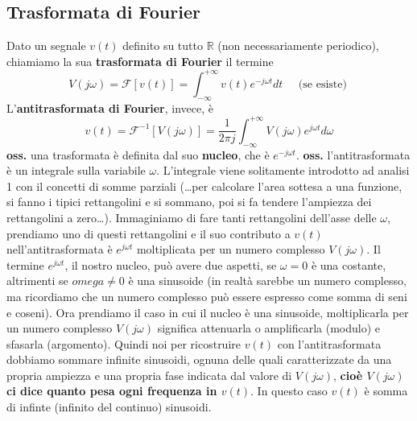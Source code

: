 \subsection{Trasformata di Fourier}
Dato un segnale $v(t)$ definito su tutto $\mathbb{R}$ (non necessariamente periodico), chiamiamo la sua \textbf{trasformata di Fourier} il termine 
\[
    V(j \omega) = \mathcal{F}[v(t)] = \int_{-\infty}^{+\infty} v(t) e^{-j \omega t} dt \;\;\;\;\;\text{(se esiste)}\;
\]
L'\textbf{antitrasformata di Fourier}, invece, è
\[
    v(t) = \mathcal{F}^{-1}[V(j \omega)] = \frac{1}{2\pi j} \int_{-\infty}^{+\infty} V(j \omega) e^{j \omega t} d \omega
\]
\textbf{oss.} una trasformata è definita dal suo \textbf{nucleo}, che è $e^{-j \omega t}$.\newline
\newline
\textbf{oss.} l'antitrasformata è un integrale sulla variabile $\omega$. L'integrale viene solitamente introdotto ad analisi 1 con il concetti di somme parziali (\dots per calcolare l'area sottesa a una funzione, si fanno i tipici rettangolini e si sommano, poi si fa tendere l'ampiezza dei rettangolini a zero\dots). Immaginiamo di fare tanti rettangolini dell'asse delle $\omega$, prendiamo uno di questi rettangolini e il suo contributo a $v(t)$ nell'antitrasformata è $e^{j \omega t}$ moltiplicata per un numero complesso $V(j \omega )$. Il termine $e^{j \omega t}$, il nostro nucleo, può avere due aspetti, se $\omega= 0$ è una costante, altrimenti se $omega \neq 0$ è una sinusoide (in realtà sarebbe un numero complesso, ma ricordiamo che un numero complesso può essere espresso come somma di seni e coseni). Ora prendiamo il caso in cui il nucleo è una sinusoide, moltiplicarla per un numero complesso $V(j \omega)$ significa attenuarla o amplificarla (modulo) e sfasarla (argomento). Quindi noi per ricostruire $v(t)$ con l'antitrasformata dobbiamo sommare infinite sinusoidi, ognuna delle quali caratterizzate da una propria ampiezza e una propria fase indicata dal valore di $V(j \omega)$, \textbf{cioè $V(j \omega)$ ci dice quanto pesa ogni frequenza in $v(t)$}. In questo caso $v(t)$ è somma di infinte (infinito del continuo) sinusoidi.
